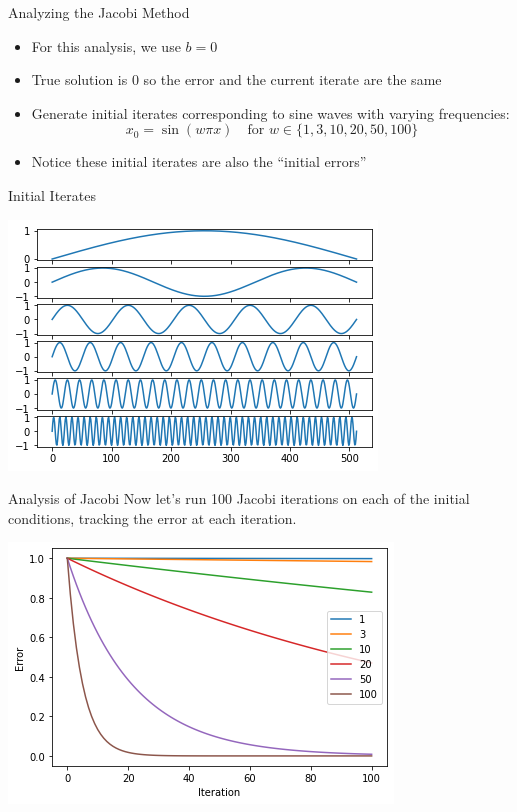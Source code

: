 \documentclass[11pt]{beamer}
\begin{document}
\begin{frame}{Analyzing the Jacobi Method}
  \begin{itemize}
  \item For this analysis, we use $b = 0$
  \item True solution is $0$ so the error and the current iterate
    are the same
  \item Generate initial iterates corresponding to sine waves with varying
    frequencies:
    \begin{equation*}
      x_0 = \sin(w \pi x) \quad \text{for } w \in \{1, 3, 10, 20, 50, 100\}
    \end{equation*}
  \item Notice these initial iterates are also the ``initial errors''
  \end{itemize}

\end{frame}
\begin{frame}{Initial Iterates}
  \begin{center}
    \includegraphics[width=\linewidth]{output_7_0.png}
  \end{center}
\end{frame}
\begin{frame}{Analysis of Jacobi}
  Now let's run 100 Jacobi iterations on each of the initial conditions,
  tracking the error at each iteration.
  \begin{center}
    \includegraphics[width=\linewidth]{output_12_0.png}
  \end{center}

\end{frame}
\end{document}
